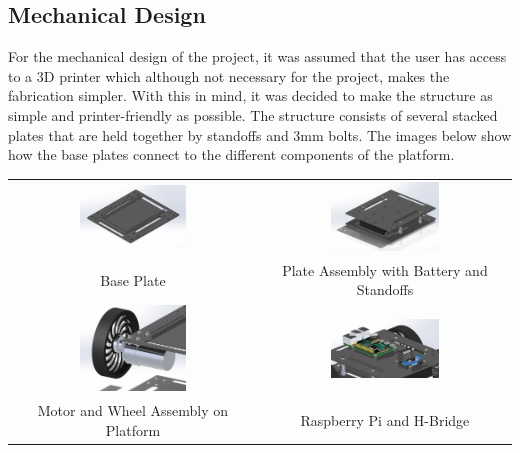 \documentclass[12pt, letterpaper,titlepage]{article}
\begin{document}
	\subsection{Mechanical Design}
    For the mechanical design of the project, it was assumed that the user has access to a 3D printer which although not necessary for the project, makes the fabrication simpler. With this in mind, it was decided to make the structure as simple and printer-friendly as possible. The structure consists of several stacked plates that are held together by standoffs and 3mm bolts. The images below show how the base plates connect to the different components of the platform.
	
	\begin{tabular}{ c c }
		\includegraphics[width=0.45\textwidth]{plate.png} & \includegraphics[width=0.45\textwidth]{plate_assembly.png} \\
		Base Plate & Plate Assembly with Battery and Standoffs \\
		\includegraphics[width=0.45\textwidth]{motort.png} & \includegraphics[width=0.45\textwidth]{pi.png}\\
		Motor and Wheel Assembly on Platform & Raspberry Pi and H-Bridge
	\end{tabular}
\end{document}
